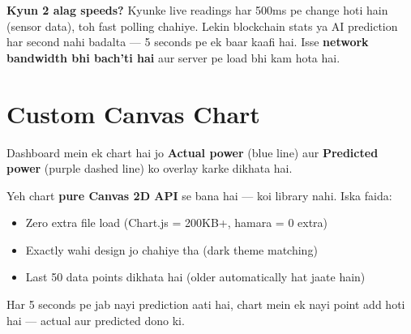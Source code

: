 \textbf{Kyun 2 alag speeds?} Kyunke live readings har 500ms pe change hoti hain (sensor data), toh fast polling chahiye. Lekin blockchain stats ya AI prediction har second nahi badalta --- 5 seconds pe ek baar kaafi hai. Isse \textbf{network bandwidth bhi bach'ti hai} aur server pe load bhi kam hota hai.

\section{Custom Canvas Chart}

Dashboard mein ek chart hai jo \textbf{Actual power} (blue line) aur \textbf{Predicted power} (purple dashed line) ko overlay karke dikhata hai.

Yeh chart \textbf{pure Canvas 2D API} se bana hai --- koi library nahi. Iska faida:
\begin{itemize}[nosep]
    \item Zero extra file load (Chart.js = 200KB+, hamara = 0 extra)
    \item Exactly wahi design jo chahiye tha (dark theme matching)
    \item Last 50 data points dikhata hai (older automatically hat jaate hain)
\end{itemize}

Har 5 seconds pe jab nayi prediction aati hai, chart mein ek nayi point add hoti hai --- actual aur predicted dono ki.
